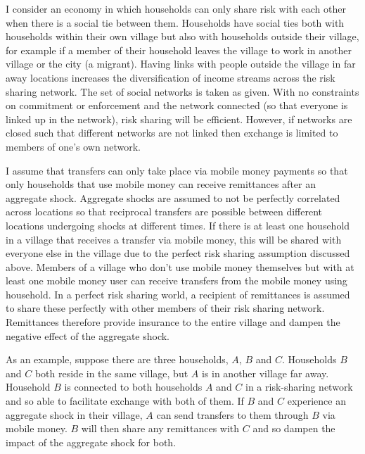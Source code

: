 I consider an economy in which households can only share risk with each other when there is a social tie between them. Households have social ties both with households within their own village but also with households outside their village, for example if a member of their household leaves the village to work in another village or the city (a migrant). Having links with people outside the village in far away locations increases the diversification of income streams across the risk sharing network. The set of social networks is taken as given. With no constraints on commitment or enforcement and the network connected (so that everyone is linked up in the network), risk sharing will be efficient. However, if networks are closed such that different networks are not linked then exchange is limited to members of one's own network. 

I assume that transfers can only take place via mobile money payments so that only households that use mobile money can receive remittances after an aggregate shock. Aggregate shocks are assumed to not be perfectly correlated across locations so that reciprocal transfers are possible between different locations undergoing shocks at different times. If there is at least one household in a village that receives a transfer via mobile money, this will be shared with everyone else in the village due to the perfect risk sharing assumption discussed above. 
Members of a village who don't use mobile money themselves but with at least one mobile money user can receive transfers from the mobile money using household. In a perfect risk sharing world, a recipient of remittances is assumed to share these perfectly with other members of their risk sharing network. Remittances therefore provide insurance to the entire village and dampen the negative effect of the aggregate shock.

As an example, suppose there are three households, $A$, $B$ and $C$.  Households $B$ and $C$ both reside in the same village, but $A$ is in another village far away. Household $B$ is connected to both households $A$ and $C$ in a risk-sharing network and so able to facilitate exchange with both of them. If $B$ and $C$ experience an aggregate shock in their village, $A$ can send transfers to them through $B$ via mobile money. $B$ will then share any remittances with $C$ and so dampen the impact of the aggregate shock for both. 

